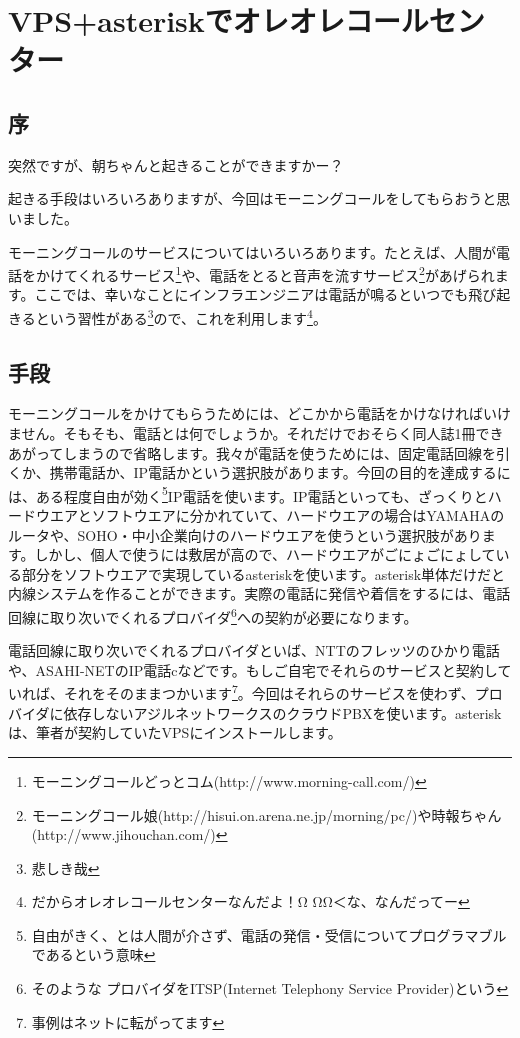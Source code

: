 \section{VPS+asteriskでオレオレコールセンター}
\subsection{序}

\begin{screen}
 \begin{center}
突然ですが、朝ちゃんと起きることができますかー？
\end{center}
\end{screen}

起きる手段はいろいろありますが、今回はモーニングコールをしてもらおうと思いました。

モーニングコールのサービスについてはいろいろあります。たとえば、人間が電話をかけてくれるサービス\footnote{モーニングコールどっとコム(http://www.morning-call.com/)}や、電話をとると音声を流すサービス\footnote{モーニングコール娘(http://hisui.on.arena.ne.jp/morning/pc/)や時報ちゃん(http://www.jihouchan.com/)}があげられます。ここでは、幸いなことにインフラエンジニアは電話が鳴るといつでも飛び起きるという習性がある\footnote{悲しき哉}ので、これを利用します\footnote{だからオレオレコールセンターなんだよ！Ω ΩΩ＜な、なんだってー}。

\subsection{手段}
モーニングコールをかけてもらうためには、どこかから電話をかけなければいけません。そもそも、電話とは何でしょうか。それだけでおそらく同人誌1冊できあがってしまうので省略します。我々が電話を使うためには、固定電話回線を引くか、携帯電話か、IP電話かという選択肢があります。今回の目的を達成するには、ある程度自由が効く\footnote{自由がきく、とは人間が介さず、電話の発信・受信についてプログラマブルであるという意味}IP電話を使います。IP電話といっても、ざっくりとハードウエアとソフトウエアに分かれていて、ハードウエアの場合はYAMAHAのルータや、SOHO・中小企業向けのハードウエアを使うという選択肢があります。しかし、個人で使うには敷居が高ので、ハードウエアがごにょごにょしている部分をソフトウエアで実現しているasteriskを使います。asterisk単体だけだと内線システムを作ることができます。実際の電話に発信や着信をするには、電話回線に取り次いでくれるプロバイダ\footnote{そのような
プロバイダをITSP(Internet Telephony Service Provider)という}への契約が必要になります。

電話回線に取り次いでくれるプロバイダといば、NTTのフレッツのひかり電話や、ASAHI-NETのIP電話cなどです。もしご自宅でそれらのサービスと契約していれば、それをそのままつかいます\footnote{事例はネットに転がってます}。今回はそれらのサービスを使わず、プロバイダに依存しないアジルネットワークスのクラウドPBXを使います。asteriskは、筆者が契約していたVPSにインストールします。

